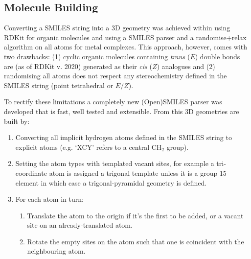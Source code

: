 \documentclass[../../main.tex]{subfiles}
\begin{document}
\subsection{Molecule Building}

Converting a SMILES string into a 3D geometry was achieved within \ade using RDKit\cite{Landrum2019} for organic molecules and using a SMILES parser and a randomise+relax algorithm on all atoms for metal complexes. This approach, however, comes with two drawbacks: (1) cyclic organic molecules containing \emph{trans} ($E$) double bonds are (as of RDKit v. 2020) generated as their \emph{cis} ($Z$) analogues and (2) randomising all atoms does not respect any stereochemistry defined in the SMILES string (point tetrahedral or $E$/$Z$).

To rectify these limitations a completely new (Open)SMILES parser was developed that is fast, well tested and extensible. From this 3D geometries are built by:

\begin{enumerate}
	\item Converting all implicit hydrogen atoms defined in the SMILES string to explicit atoms (e.g. `XCY' refers to a central CH$_2$ group).
	\item Setting the atom types with templated vacant sites, for example a tri-coordinate atom is assigned a trigonal template unless it is a group 15 element in which case a trigonal-pyramidal geometry is defined. 
	\item For each atom in turn:
	\begin{enumerate}
		\item Translate the atom to the origin if it's the first to be added, or a vacant site on an already-translated atom.
		\item Rotate the empty sites on the atom such that one is coincident with the neighbouring atom.
	\end{enumerate}
\end{enumerate}
\end{document}
